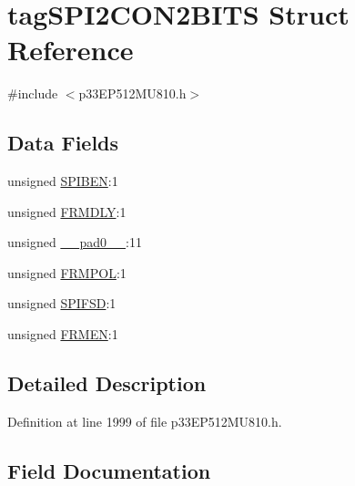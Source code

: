 \hypertarget{structtag_s_p_i2_c_o_n2_b_i_t_s}{}\section{tag\+S\+P\+I2\+C\+O\+N2\+B\+I\+TS Struct Reference}
\label{structtag_s_p_i2_c_o_n2_b_i_t_s}


{\ttfamily \#include $<$p33\+E\+P512\+M\+U810.\+h$>$}

\subsection*{Data Fields}
\begin{DoxyCompactItemize}
\item 
unsigned \hyperlink{structtag_s_p_i2_c_o_n2_b_i_t_s_a48f1b49d7589da2ee8c38cd6d820a542}{S\+P\+I\+B\+EN}\+:1
\item 
unsigned \hyperlink{structtag_s_p_i2_c_o_n2_b_i_t_s_abc2e71af924cda26b91c8945dc68c1d4}{F\+R\+M\+D\+LY}\+:1
\item 
unsigned \hyperlink{structtag_s_p_i2_c_o_n2_b_i_t_s_adf71f3d8410c1f1dbbc96680a92c49af}{\+\_\+\+\_\+pad0\+\_\+\+\_\+}\+:11
\item 
unsigned \hyperlink{structtag_s_p_i2_c_o_n2_b_i_t_s_a3f77b33ab0ae8182d247d8a75ce9795f}{F\+R\+M\+P\+OL}\+:1
\item 
unsigned \hyperlink{structtag_s_p_i2_c_o_n2_b_i_t_s_aeb3b552a9f7c25bc1ae09655904e34cc}{S\+P\+I\+F\+SD}\+:1
\item 
unsigned \hyperlink{structtag_s_p_i2_c_o_n2_b_i_t_s_a312bafba1b24944c8dfc39323e8fd4e9}{F\+R\+M\+EN}\+:1
\end{DoxyCompactItemize}


\subsection{Detailed Description}


Definition at line 1999 of file p33\+E\+P512\+M\+U810.\+h.



\subsection{Field Documentation}
\mbox{\label{structtag_s_p_i2_c_o_n2_b_i_t_s_adf71f3d8410c1f1dbbc96680a92c49af}} 
